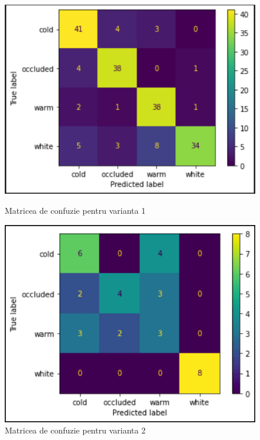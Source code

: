 \documentclass{article}
\begin{document}
  \begin{figure}[!htb]
    \begin{minipage}{0.45\textwidth}
      \centering
      \includegraphics[width=1\linewidth]{model_v1_colored_confusion_matrix.png}
      \caption{Matricea de confuzie pentru varianta 1}\label{Fig:Cold1}
    \end{minipage}\hfill
    \begin{minipage}{0.45\textwidth}
      \centering
      \includegraphics[width=1\linewidth]{model_v2_bw_confusion_matrix.png}
      \caption{Matricea de confuzie pentru varianta 2}\label{Fig:Cold2}
    \end{minipage}
 \end{figure}
\end{document}
